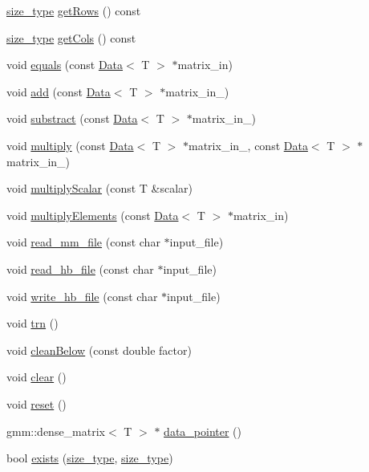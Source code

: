 \begin{DoxyCompactItemize}
\item 
\hyperlink{lmx__mat__data_8h_a49b489a408a211a90e766329c0732d7b}{size\-\_\-type} \hyperlink{classlmx_1_1Type__gmm_a5ebd01e84e9fc135980505b50e6fb905}{get\-Rows} () const 
\item 
\hyperlink{lmx__mat__data_8h_a49b489a408a211a90e766329c0732d7b}{size\-\_\-type} \hyperlink{classlmx_1_1Type__gmm_a9ce4b3838d94c5a5a82b4b7a69c0359c}{get\-Cols} () const 
\item 
void \hyperlink{classlmx_1_1Type__gmm_a697613fbd50e50e829f3ec20562854a0}{equals} (const \hyperlink{classlmx_1_1Data}{Data}$<$ T $>$ $\ast$matrix\-\_\-in)
\item 
void \hyperlink{classlmx_1_1Type__gmm_a3663f6cd5b201303c044cfce9cb34f99}{add} (const \hyperlink{classlmx_1_1Data}{Data}$<$ T $>$ $\ast$matrix\-\_\-in\-\_)
\item 
void \hyperlink{classlmx_1_1Type__gmm_a22929d5ae61b024918d65ebe89930883}{substract} (const \hyperlink{classlmx_1_1Data}{Data}$<$ T $>$ $\ast$matrix\-\_\-in\-\_)
\item 
void \hyperlink{classlmx_1_1Type__gmm_a46967449410f995dba61743d2819005e}{multiply} (const \hyperlink{classlmx_1_1Data}{Data}$<$ T $>$ $\ast$matrix\-\_\-in\-\_, const \hyperlink{classlmx_1_1Data}{Data}$<$ T $>$ $\ast$matrix\-\_\-in\-\_)
\item 
void \hyperlink{classlmx_1_1Type__gmm_a3283a17010dd73bfd17146f7afd2771f}{multiply\-Scalar} (const T \&scalar)
\item 
void \hyperlink{classlmx_1_1Type__gmm_aa1d074b733fb6f21debf53361aaefc44}{multiply\-Elements} (const \hyperlink{classlmx_1_1Data}{Data}$<$ T $>$ $\ast$matrix\-\_\-in)
\item 
void \hyperlink{classlmx_1_1Type__gmm_a28f293a101f7e860d1ea1a113a923864}{read\-\_\-mm\-\_\-file} (const char $\ast$input\-\_\-file)
\item 
void \hyperlink{classlmx_1_1Type__gmm_a7463e17cac7443907a717cbe4814bc8b}{read\-\_\-hb\-\_\-file} (const char $\ast$input\-\_\-file)
\item 
void \hyperlink{classlmx_1_1Type__gmm_a03639818d7f55d592ec51e58b3ba0b87}{write\-\_\-hb\-\_\-file} (const char $\ast$input\-\_\-file)
\item 
void \hyperlink{classlmx_1_1Type__gmm_a73b5260b87a6188af420f6288e1fc573}{trn} ()
\item 
void \hyperlink{classlmx_1_1Type__gmm_a13e2324f08f06cab6a026dc6aee81a3d}{clean\-Below} (const double factor)
\item 
void \hyperlink{classlmx_1_1Type__gmm_a3c4bcbfdb635c44c973eec21180dd417}{clear} ()
\item 
void \hyperlink{classlmx_1_1Type__gmm_ab315549dff2d6ccf296e795d457b2e5f}{reset} ()
\item 
gmm\-::dense\-\_\-matrix$<$ T $>$ $\ast$ \hyperlink{classlmx_1_1Type__gmm_aa35f121de0945469b3c700a16be14f02}{data\-\_\-pointer} ()
\item 
bool \hyperlink{classlmx_1_1Type__gmm_a65cedef38a61900940cd3efe616d7182}{exists} (\hyperlink{lmx__mat__data_8h_a49b489a408a211a90e766329c0732d7b}{size\-\_\-type}, \hyperlink{lmx__mat__data_8h_a49b489a408a211a90e766329c0732d7b}{size\-\_\-type})
\end{DoxyCompactItemize}


